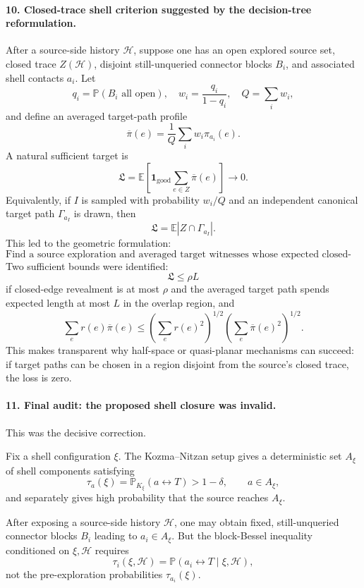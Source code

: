 \documentclass[11pt]{article}
\newcommand{\one}{\mathbf 1}
\begin{document}
\paragraph{10. Closed-trace shell criterion suggested by the decision-tree reformulation.}
After a source-side history \(\mathcal H\), suppose one has an open explored source set, closed trace \(Z(\mathcal H)\), disjoint still-unqueried connector blocks \(B_i\), and associated shell contacts \(a_i\). Let
\[
q_i=\mathbb P(B_i\text{ all open}),
\quad
w_i=\frac{q_i}{1-q_i},
\quad
Q=\sum_iw_i,
\]
and define an averaged target-path profile
\[
\overline\pi(e)=\frac1Q\sum_iw_i\pi_{a_i}(e).
\]
A natural sufficient target is
\[
\boxed{
\mathfrak L
=
\mathbb E\left[
\one_{\mathrm{good}}\sum_{e\in Z}\overline\pi(e)
\right]\longrightarrow0.
}
\tag{CTS}\label{eq:cts}
\]
Equivalently, if \(I\) is sampled with probability \(w_i/Q\) and an independent canonical target path \(\Gamma_{a_I}\) is drawn, then
\[
\mathfrak L=\mathbb E|Z\cap\Gamma_{a_I}|.
\]
This led to the geometric formulation:
\[
\boxed{
\text{Find a source exploration and averaged target witnesses
whose expected closed-edge intersection tends to zero.}
}
\]
Two sufficient bounds were identified:
\[
\mathfrak L\le\rho L
\]
if closed-edge revealment is at most \(\rho\) and the averaged target path spends expected length at most \(L\) in the overlap region, and
\[
\sum_er(e)\overline\pi(e)
\le
\left(\sum_er(e)^2\right)^{1/2}
\left(\sum_e\overline\pi(e)^2\right)^{1/2}.
\]
This makes transparent why half-space or quasi-planar mechanisms can succeed: if target paths can be chosen in a region disjoint from the source's closed trace, the loss is zero.

\paragraph{11. Final audit: the proposed shell closure was invalid.}
This was the decisive correction.

Fix a shell configuration \(\xi\). The Kozma--Nitzan setup gives a deterministic set \(A_\xi\) of shell components satisfying
\[
\tau_a(\xi)
=
\mathbb P_{K_\xi}(a\leftrightarrow T)>1-\delta,
\qquad a\in A_\xi,
\]
and separately gives high probability that the source reaches \(A_\xi\).

After exposing a source-side history \(\mathcal H\), one may obtain fixed, still-unqueried connector blocks \(B_i\) leading to \(a_i\in A_\xi\). But the block-Bessel inequality conditioned on \(\xi,\mathcal H\) requires
\[
\tau_i(\xi,\mathcal H)
=
\mathbb P(a_i\leftrightarrow T\mid\xi,\mathcal H),
\]
not the pre-exploration probabilities \(\tau_{a_i}(\xi)\).
\end{document}
